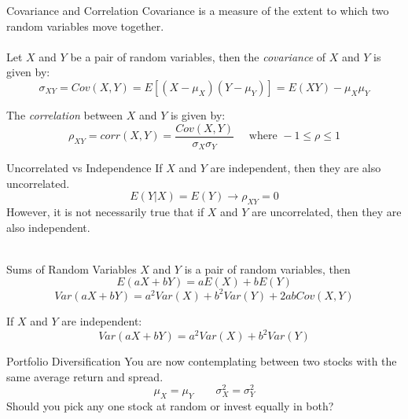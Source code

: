 \documentclass{./../div_teaching_slides}
\begin{document}
\begin{frame}{Covariance and Correlation}
Covariance is a measure of the extent to which two random variables move
together. \\~\\
Let $X$ and $Y$ be a pair of random variables, then the \textit{covariance} of $X$ and $Y$ is given by:
$$ \sigma_{XY} = Cov(X,Y) = E[(X-\mu_X)(Y-\mu_Y)] = E(XY)-\mu_X \mu_Y $$ 
\vspace{0.15em}

The \textit{correlation} between $X$ and $Y$ is given by:
$$ \rho_{XY} = corr(X,Y) = \frac{Cov(X,Y)}{\sigma_X \sigma_Y} \quad \text{ where } -1 \leq \rho \leq 1$$
\end{frame}

\begin{frame}{Uncorrelated vs Independence}
If $X$ and $Y$ are independent, then they are also uncorrelated. 
$$ E(Y|X) = E(Y) \rightarrow \rho_{XY} = 0 $$
However, it is not necessarily true that if $X$ and $Y$ are uncorrelated, then they are also independent. \\~\\
\end{frame}

\begin{frame}{Sums of Random Variables}
$X$ and $Y$ is a pair of random variables, then
$$ E(aX+bY) = aE(X) + bE(Y) $$
$$ Var(aX+bY) = a^2Var(X) + b^2 Var(Y) + 2 ab Cov(X,Y) $$

\vspace{1em}
If $X$ and $Y$ are independent:
$$ Var(aX+bY) = a^2 Var(X) + b^2 Var(Y) $$
\end{frame}

\begin{frame}{Portfolio Diversification}
You are now contemplating between two stocks with the same average return and spread.  
$$ \mu_X = \mu_Y \quad \quad \sigma^2_X = \sigma^2_Y $$
Should you pick any one stock at random or invest equally in both?
\end{frame}


\end{document}
